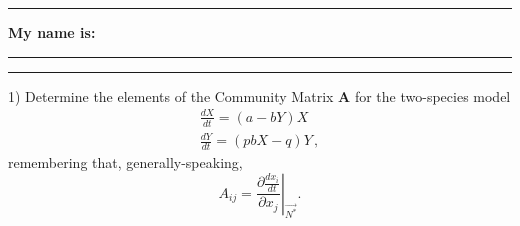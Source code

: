 \documentclass{article}
\newcommand*{\blanks}[1][4em]{\rule{#1}{.4pt}}
\begin{document}
\noindent{}

\rule[0.5ex]{\linewidth}{1pt}
\begin{center}
	\textbf{My name is:} \blanks[150pt]
\end{center}
\rule[0.5ex]{\linewidth}{1pt}

1) Determine the elements of the Community Matrix $\textbf{A}$ for the  two-species model
	\begin{align*}
		\frac{dX}{dt} = (a-bY) X \\
		\frac{dY}{dt} = (pbX - q) Y \, ,
	\end{align*}
remembering that, generally-speaking, 
	\begin{equation*}
		A_{ij} = \left . \frac{ \partial \frac{dx_i}{dt} }{\partial x_j} \right \vert_{\vec{N^*}}.
	\end{equation*}
\vspace{10cm}
\end{document}
